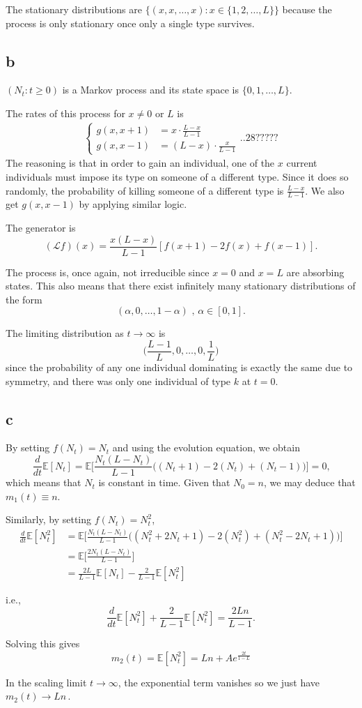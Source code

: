 \documentclass[12pt, twoside, a4paper]{article}
\newcommand{\Gen}{\mathcal{L}}
\begin{document}
The stationary distributions are $\{(x, x, \dots, x) : x \in \{1, 2, \dots, L\}\}$ because the process is only stationary once only a single type survives. 

\subsection*{b}
$(N_t : t \geq 0)$ is a Markov process and its state space is $\{0, 1, \dots, L\}$. 

The rates of this process for $x \neq 0 \text{ or } L$ is 
\begin{align*}
\begin{cases}
g(x, x+1) &= x \cdot \frac{L-x}{L-1}\\
g(x, x-1) &= (L-x) \cdot \frac{x}{L-1}
\end{cases}
..28?????\end{align*}
The reasoning is that in order to gain an individual, one of the $x$ current individuals must impose its type on someone of a different type. Since it does so randomly, the probability of killing someone of a different type is $\frac{L-x}{L-1}$. We also get $g(x, x-1)$ by applying similar logic. 

The generator is 
\[
(\Gen f) (x) = \frac{x(L-x)}{L-1} [f(x+1) - 2f(x) + f(x-1)] \text{.}
\]

The process is, once again, not irreducible since $x = 0$ and $x = L$ are absorbing states. This also means that there exist infinitely many stationary distributions of the form 
\[
(\alpha, 0, \dots, 1- \alpha) \text{ , } \alpha \in [0, 1] \text{.}
\]

The limiting distribution as $t \to \infty$ is 
\[
\bigg( \frac{L-1}{L}, 0, \dots, 0, \frac{1}{L} \bigg)
\]
since the probability of any one individual dominating is exactly the same due to symmetry, and there was only one individual of type $k$ at $t = 0$. 

\subsection*{c}
By setting $f(N_t) = N_t$ and using the evolution equation, we obtain 
\[
\frac{d}{dt} \mathbb{E} [N_t] = \mathbb{E} \bigg[ \frac{N_t (L-N_t)}{L-1} \bigg( (N_t+1) - 2(N_t) + (N_t-1) \bigg) \bigg] = 0 \text{,}
\]
which means that $N_t$ is constant in time. Given that $N_0 = n$, we may deduce that $m_1(t) \equiv n$. 

Similarly, by setting $f(N_t) = N_t^2$, 
\begin{align*}
\frac{d}{dt} \mathbb{E} [N_t^2] 
&= \mathbb{E} \bigg[ \frac{N_t (L-N_t)}{L-1} \bigg( (N_t^2 + 2 N_t +1) - 2(N_t^2) + (N_t^2 - 2 N_t +1) \bigg) \bigg] \\
&= \mathbb{E} \bigg[ \frac{2 N_t (L - N_t)}{L-1} \bigg]\\
&= \frac{2L}{L-1} \mathbb{E} [N_t] - \frac{2}{L-1} \mathbb{E} [N_t^2]
\end{align*}

i.e., 
\[
\frac{d}{dt} \mathbb{E} [N_t^2] + \frac{2}{L-1} \mathbb{E} [N_t^2] = \frac{2Ln}{L-1} \text{.}
\]

Solving this gives
\[
m_2(t) = \mathbb{E} [N_t^2] = Ln + Ae^{\frac{2t}{1-L}}
\]

In the scaling limit $t \to \infty$, the exponential term vanishes so we just have $m_2(t) \to Ln \,$. 
\end{document}
